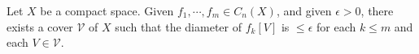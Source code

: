 Let $X$ be a compact space. Given $f_1, \cdots, f_m \in C_n(X)$, and given $\epsilon > 0$, there exists a cover $\mathcal{V}$ of $X$ such that the diameter of $f_k[V]$ is $\leq \epsilon$ for each $k \leq m$ and each $V \in \mathcal{V}$.
